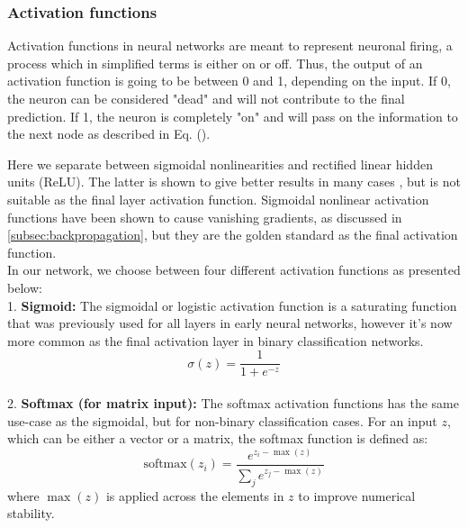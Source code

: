 \subsubsection{Activation functions}\label{sssec:activation_functions}

Activation functions in neural networks are meant to represent neuronal firing, a process which in simplified terms is either on or off. Thus, the output 
of an activation function is going to be between 0 and 1, depending on the input. If 0, the neuron can be considered "dead" and will not contribute 
to the final prediction. If 1, the neuron is completely "on" and will pass on the information to the next node as described in Eq. (\cite{ffnn}). 

Here we separate between sigmoidal nonlinearities and rectified linear hidden units (ReLU). The latter is shown to give better results in many cases 
\cite{relu_best_ever}, but is not suitable as the final layer activation function. Sigmoidal nonlinear activation functions have been shown to 
cause vanishing gradients, as discussed in \ref{subsec:backpropagation}, but they are the golden standard as the final activation function. 
\\
In our network, we choose between four different activation functions as presented below: 
\\
1. \textbf{Sigmoid:}
The sigmoidal or logistic activation function is a saturating function that was previously used for all layers in early neural networks, 
however it's now more common as the final activation layer in binary classification networks.
\[
\sigma(z) = \frac{1}{1 + e^{-z}}
\]
\\
2. \textbf{Softmax (for matrix input):}
The softmax activation functions has the same use-case as the sigmoidal, but for non-binary classification cases. 
For an input \( z \), which can be either a vector or a matrix, the softmax function is defined as:
\[
\text{softmax}(z_i) = \frac{e^{z_i - \max(z)}}{\sum_{j} e^{z_j - \max(z)}}
\]
where \(\max(z)\) is applied across the elements in \( z \) to improve numerical stability.

